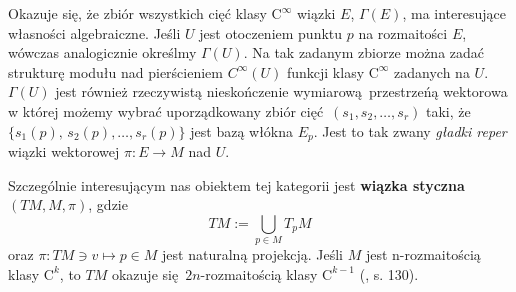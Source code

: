 Okazuje się, że zbiór wszystkich cięć klasy \(\mathrm{C}^\infty\) wiązki \(E\), \(\Gamma(E)\), ma interesujące własności algebraiczne. Jeśli \(U\) jest otoczeniem punktu \(p\) na rozmaitości \(E\), wówczas analogicznie określmy \(\Gamma(U)\). Na tak zadanym zbiorze można zadać strukturę modułu nad pierścieniem \(C^\infty(U)\) funkcji klasy \(\mathrm{C}^\infty\) zadanych na \(U\). \(\Gamma(U)\) jest również rzeczywistą nieskończenie wymiarową przestrzeńą wektorowa w której możemy wybrać uporządkowany zbiór cięć \((s_1, s_2, \dots, s_r)\) taki, że \(\{s_1(p),\, s_2(p), \dots, s_r(p)\}\) jest bazą włókna \(E_p\). Jest to tak zwany \emph{gładki reper} wiązki wektorowej \(\pi:E\to M\) nad \(U\).



Szczególnie interesującym nas obiektem tej kategorii jest \textbf{wiązka styczna} \((TM, M, \pi)\), gdzie
\begin{equation*}
TM := \bigcup\limits_{p\in M} T_p M
\end{equation*}
oraz \(\pi: TM \ni v \mapsto p\in M\) jest naturalną projekcją.
Jeśli \(M\) jest n-rozmaitością klasy \(\mathrm{C}^k\), to \(TM\) okazuje się \(2n\)-rozmaitością klasy \(\mathrm{C}^{k-1}\) (\cite{tu}, s. 130).

